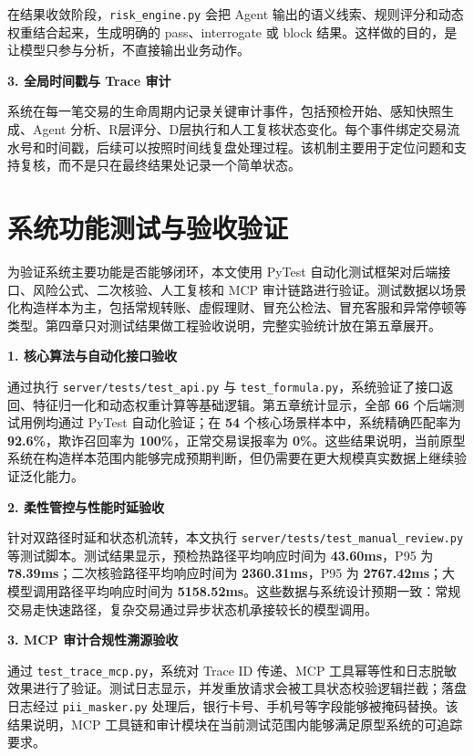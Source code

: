 \documentclass{xduugthesis}
\begin{document}
在结果收敛阶段，\texttt{risk\_engine.py} 会把 Agent 输出的语义线索、规则评分和动态权重结合起来，生成明确的 pass、interrogate 或 block 结果。这样做的目的，是让模型只参与分析，不直接输出业务动作。

\textbf{3. 全局时间戳与 Trace 审计}

系统在每一笔交易的生命周期内记录关键审计事件，包括预检开始、感知快照生成、Agent 分析、R层评分、D层执行和人工复核状态变化。每个事件绑定交易流水号和时间戳，后续可以按照时间线复盘处理过程。该机制主要用于定位问题和支持复核，而不是只在最终结果处记录一个简单状态。

\section{系统功能测试与验收验证}

为验证系统主要功能是否能够闭环，本文使用 PyTest 自动化测试框架对后端接口、风险公式、二次核验、人工复核和 MCP 审计链路进行验证。测试数据以场景化构造样本为主，包括常规转账、虚假理财、冒充公检法、冒充客服和异常停顿等类型。第四章只对测试结果做工程验收说明，完整实验统计放在第五章展开。

\textbf{1. 核心算法与自动化接口验收}

通过执行 \texttt{server/tests/test\_api.py} 与 \texttt{test\_formula.py}，系统验证了接口返回、特征归一化和动态权重计算等基础逻辑。第五章统计显示，全部 \textbf{66} 个后端测试用例均通过 PyTest 自动化验证；在 \textbf{54} 个核心场景样本中，系统精确匹配率为 \textbf{92.6\%}，欺诈召回率为 \textbf{100\%}，正常交易误报率为 \textbf{0\%}。这些结果说明，当前原型系统在构造样本范围内能够完成预期判断，但仍需要在更大规模真实数据上继续验证泛化能力。

\textbf{2. 柔性管控与性能时延验收}

针对双路径时延和状态机流转，本文执行 \texttt{server/tests/test\_manual\_review.py} 等测试脚本。测试结果显示，预检热路径平均响应时间为 \textbf{43.60ms}，P95 为 \textbf{78.39ms}；二次核验路径平均响应时间为 \textbf{2360.31ms}，P95 为 \textbf{2767.42ms}；大模型调用路径平均响应时间为 \textbf{5158.52ms}。这些数据与系统设计预期一致：常规交易走快速路径，复杂交易通过异步状态机承接较长的模型调用。

\textbf{3. MCP 审计合规性溯源验收}

通过 \texttt{test\_trace\_mcp.py}，系统对 Trace ID 传递、MCP 工具幂等性和日志脱敏效果进行了验证。测试日志显示，并发重放请求会被工具状态校验逻辑拦截；落盘日志经过 \texttt{pii\_masker.py} 处理后，银行卡号、手机号等字段能够被掩码替换。该结果说明，MCP 工具链和审计模块在当前测试范围内能够满足原型系统的可追踪要求。
\end{document}
